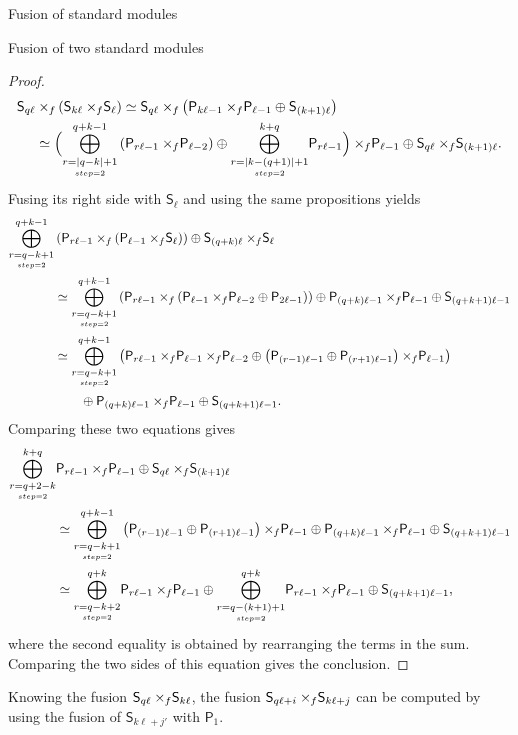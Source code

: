 \documentclass[reqno]{amsart}
\newcommand{\ds}[1]{\mathsf S_{#1}}
\newcommand{\dP}[1]{\mathsf P_{#1}}
\newcommand{\xf}{\times\hspace{-0.27em}_f}
\newcommand{\lc}{\ell}
\begin{document}
\begin{section}{Fusion of standard modules}
\begin{subsection}{Fusion of two standard modules}
\begin{proof}
\begin{align}
\ds{q \lc} & \xf \left(\ds{ k \lc} \xf \ds{\lc}\right)  \simeq \ds{q \lc} \xf \left( \dP{k \lc -1} \xf \dP{\lc -1} \oplus \ds{(k+1) \lc}\right)\notag\\
& \simeq \Big(  \overset{q+k-1}{\underset{\underset{step =2}{r = |q-k| + 1}}{\bigoplus}}\left( \dP{r \lc -1} \xf \dP{\lc-2}\right) \oplus \overset{k+q}{\underset{\underset{step =2}{r = |k-(q+1)| + 1}}{\bigoplus}} \dP{r \lc -1} \Big) \xf \dP{\lc -1} \oplus \ds{q \lc} \xf \ds{(k+1)\lc}.
\end{align}
Fusing its right side with $\ds{\lc}$ and using the same propositions yields
\begin{align}
\overset{q+k-1}{\underset{\underset{step =2}{r = q-k+1}}{\bigoplus}}&\left(\dP{r \lc -1} \xf \left(\dP{\lc -1}\xf \ds{\lc} \right) \right) \oplus \ds{(q+k)\lc}\xf \ds{\lc} \notag\\
&\simeq \overset{q+k-1}{\underset{\underset{step =2}{r = q-k+1}}{\bigoplus}}\left(\dP{r \lc -1} \xf \left(\dP{\lc -1}\xf \dP{\lc-2} \oplus \dP{2 \lc -1} \right) \right) \oplus \dP{(q+k)\lc-1}\xf \dP{\lc-1} \oplus \ds{(q+k+1)\lc -1} \notag\\
& \simeq \overset{q+k-1}{\underset{\underset{step =2}{r = q-k+1}}{\bigoplus}}\left(\dP{r \lc -1} \xf \dP{\lc -1}\xf \dP{\lc-2} \oplus \left(\dP{(r-1 )\lc -1}\oplus\dP{(r+1)\lc -1}\right) \xf\dP{\lc -1}  \right) \notag\\
&\qquad \oplus \dP{(q+k)\lc-1}\xf \dP{\lc-1} \oplus \ds{(q+k+1)\lc -1}.
\end{align}
Comparing these two equations gives
\begin{align*}
\overset{k+q}{\underset{\underset{step =2}{r = q+2-k}}{\bigoplus}} &\dP{r \lc -1} \xf \dP{\lc -1} \oplus \ds{q \lc} \xf \ds{(k+1)\lc} \\
&\simeq \overset{q+k-1}{\underset{\underset{step =2}{r = q-k+1}}{\bigoplus}}\left(\dP{(r-1 )\lc -1}\oplus\dP{(r+1)\lc -1}\right) \xf\dP{\lc -1} \oplus \dP{(q+k)\lc-1}\xf \dP{\lc-1} \oplus \ds{(q+k+1)\lc -1} \notag\\
& \simeq \overset{q+k}{\underset{\underset{step =2}{r = q-k+2}}{\bigoplus}}\dP{r\lc -1} \xf \dP{\lc -1} \oplus \overset{q+k}{\underset{\underset{step =2}{r = q-(k+1) +1 }}{\bigoplus}}\dP{r\lc -1} \xf \dP{\lc -1} \oplus \ds{(q+k+1)\lc -1},
\end{align*}
where the second equality is obtained by rearranging the terms in the sum. Comparing the two sides of this equation gives the conclusion.
\end{proof}
Knowing the fusion $\ds{q \lc} \xf \ds{k \lc}$, the fusion $\ds{q\lc +i} \xf \ds{k \lc +j}$ can be computed by using the fusion of $\ds{k \lc +j'}$ with $\dP{1}$.

\end{subsection}
\end{section}
\end{document}
